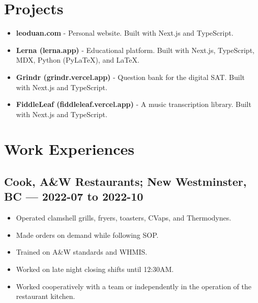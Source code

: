 \documentclass{article}
\begin{document}
\section*{Projects}

\begin{itemize}
    \item \textbf{leoduan.com} - Personal website. Built with Next.js and TypeScript.
    \item \textbf{Lerna (lerna.app)} - Educational platform. Built with Next.js, TypeScript, MDX, Python (PyLaTeX), and LaTeX.
    \item \textbf{Grindr (grindr.vercel.app)} - Question bank for the digital SAT. Built with Next.js and TypeScript.
    \item \textbf{FiddleLeaf (fiddleleaf.vercel.app)} - A music transcription library. Built with Next.js and TypeScript.
\end{itemize}

\section*{Work Experiences}

\subsection*{Cook, A\&W Restaurants; New Westminster, BC — 2022-07 to 2022-10}

\begin{itemize}
    \item Operated clamshell grills, fryers, toasters, CVaps, and Thermodynes.
    \item Made orders on demand while following SOP.
    \item Trained on A\&W standards and WHMIS.
    \item Worked on late night closing shifts until 12:30AM.
    \item Worked cooperatively with a team or independently in the operation of the restaurant kitchen.
\end{itemize}


\end{document}
